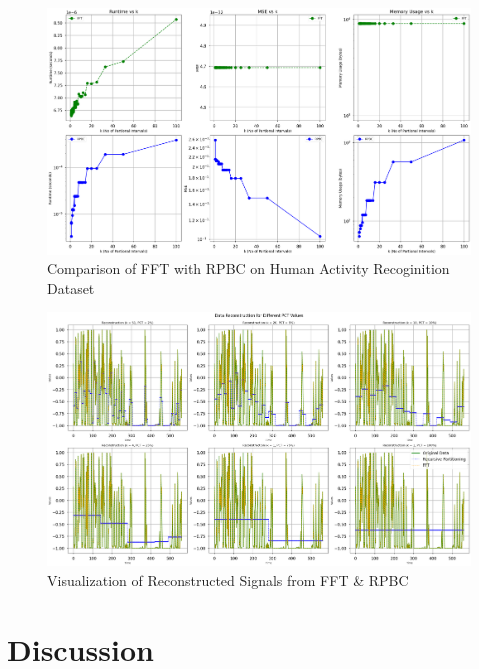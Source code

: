 \documentclass[onecolumn,conference]{IEEEtran}
\begin{document}
\begin{figure}[!h]
    \centering
    \includegraphics[width=0.9\linewidth, height=0.7\linewidth, keepaspectratio]{images/Experiment 2 Part b.png}
    \caption{Comparison of FFT with RPBC on Human Activity Recoginition Dataset}
    \label{fig:2b}
\end{figure}
\begin{figure}[!h]
    \centering
    \includegraphics[width=0.9\linewidth, height=0.7\linewidth, keepaspectratio]{images/Experiment 2 Part c.png}
    \caption{Visualization of Reconstructed Signals from FFT \& RPBC}
    \label{fig:2c}
\end{figure}

\section{Discussion}
\end{document}
